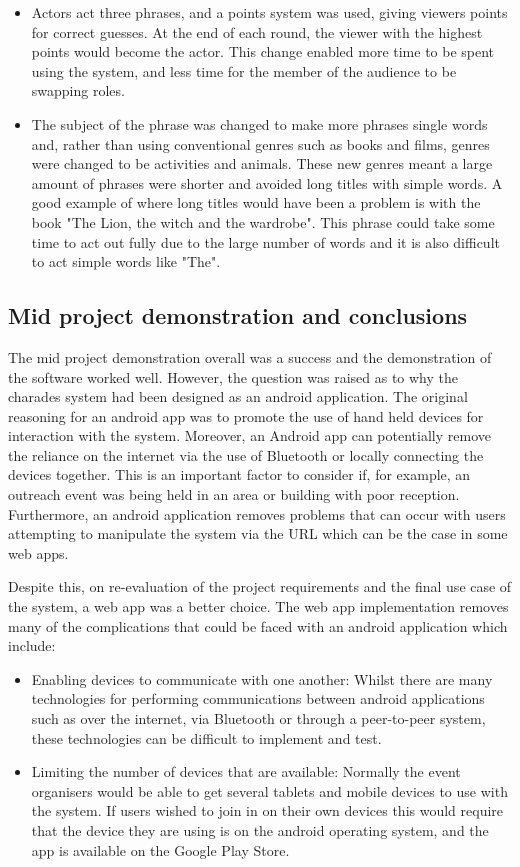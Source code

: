 \begin{itemize}
	 \item Actors act three phrases, and a points system was used, giving viewers points for correct guesses. At the end of each round, the viewer with the highest points would become the actor. This change enabled more time to be spent using the system, and less time for the member of the audience to be swapping roles.
	 
	 \item The subject of the phrase was changed to make more phrases single words and, rather than using conventional genres such as books and films, genres were changed to be activities and animals. These new genres meant a large amount of phrases were shorter and avoided long titles with simple words. A good example of where long titles would have been a problem is with the book "The Lion, the witch and the wardrobe". This phrase could take some time to act out fully due to the large number of words and it is also difficult to act simple words like "The".
\end{itemize} 

\subsection{Mid project demonstration and conclusions}
The mid project demonstration overall was a success and the demonstration of the software worked well. However, the question was raised as to why the charades system had been designed as an android application. The original reasoning for an android app was to promote the use of hand held devices for interaction with the system. Moreover, an Android app can potentially remove the reliance on the internet via the use of Bluetooth or locally connecting the devices together. This is an important factor to consider if, for example, an outreach event was being held in an area or building with poor reception. Furthermore, an android application removes problems that can occur with users attempting to manipulate the system via the URL which can be the case in some web apps.

Despite this, on re-evaluation of the project requirements and the final use case of the system, a web app was a better choice. The web app implementation removes many of the complications that could be faced with an android application which include:
\begin{itemize}
	\item Enabling devices to communicate with one another: Whilst there are many technologies for performing communications between android applications such as over the internet, via Bluetooth or through a peer-to-peer system, these technologies can be difficult to implement and test.
	\item Limiting the number of devices that are available: Normally the event organisers would be able to get several tablets and mobile devices to use with the system. If users wished to join in on their own devices this would require that the device they are using is on the android operating system, and the app is available on the Google Play Store.
\end{itemize}

